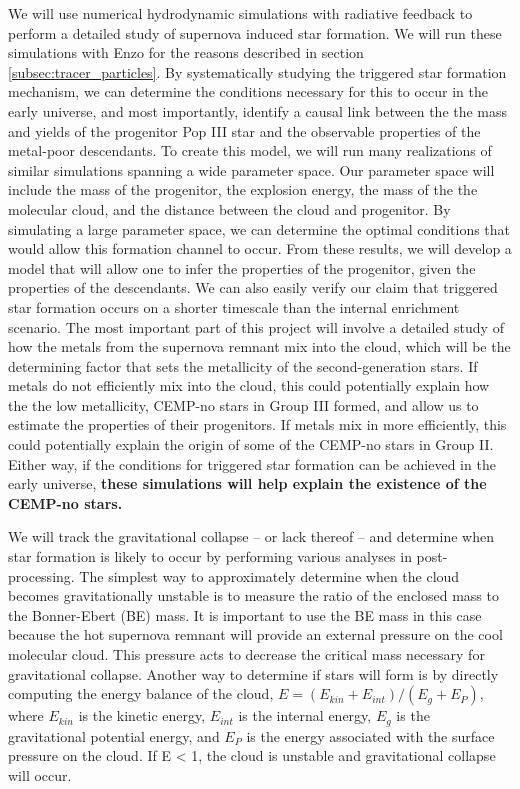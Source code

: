 \documentclass[a4paper, 12pt]{article}
\begin{document}
We will use numerical hydrodynamic simulations with radiative feedback to perform a detailed study of supernova induced star formation. We will run these simulations with Enzo for the reasons described in section \ref{subsec:tracer_particles}. By systematically studying the triggered star formation mechanism, we can determine the conditions necessary for this to occur in the early universe, and most importantly, identify a causal link between the the mass and yields of the progenitor Pop III star and the observable properties of the metal-poor descendants. To create this model, we will run many realizations of similar simulations spanning a wide parameter space. Our parameter space will include the mass of the progenitor, the explosion energy, the mass of the the molecular cloud, and the distance between the cloud and progenitor. By simulating a large parameter space, we can determine the optimal conditions that would allow this formation channel to occur. From these results, we will develop a model that will allow one to infer the properties of the progenitor, given the properties of the descendants. We can also easily verify our claim that triggered star formation occurs on a shorter timescale than the internal enrichment scenario. The most important part of this project will involve a detailed study of how the metals from the supernova remnant mix into the cloud, which will be the determining factor that sets the metallicity of the second-generation stars. If metals do not efficiently mix into the cloud, this could potentially explain how the the low metallicity, CEMP-no stars in Group III formed, and allow us to estimate the properties of their progenitors. If metals mix in more efficiently, this could potentially explain the origin of some of the CEMP-no stars in Group II. Either way, if the conditions for triggered star formation can be achieved in the early universe, \textbf{these simulations will help explain the existence of the CEMP-no stars.}

We will track the gravitational collapse -- or lack thereof -- and determine when star formation is likely to occur by performing various analyses in post-processing. The simplest way to approximately determine when the cloud becomes gravitationally unstable is to measure the ratio of the enclosed mass to the Bonner-Ebert (BE) mass. It is important to use the BE mass in this case because the hot supernova remnant will provide an external pressure on the cool molecular cloud. This pressure acts to decrease the critical mass necessary for gravitational collapse. Another way to determine if stars will form is by directly computing the energy balance of the cloud, $E = (E_{kin} + E_{int}) / (E_{g} + E_{P})$, where $E_{kin}$ is the kinetic energy, $E_{int}$ is the internal energy, $E_{g}$ is the gravitational potential energy, and $E_{P}$ is the energy associated with the surface pressure on the cloud. If E < 1, the cloud is unstable and gravitational collapse will occur.
\end{document}
